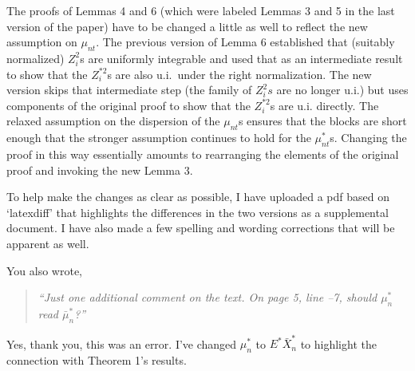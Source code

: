 \documentclass[12pt]{article}
\begin{document}
The proofs of Lemmas 4 and 6 (which were labeled Lemmas 3 and 5 in the
last version of the paper) have to be changed a little as well to
reflect the new assumption on $\mu_{nt}$. The previous version of
Lemma 6 established that (suitably normalized) $Z_i^2$s are uniformly
integrable and used that as an intermediate result to show that the
$Z_i^{*2}$s are also u.i.\ under the right normalization. The new
version skips that intermediate step (the family of $Z_i^2s$ are no
longer u.i.) but uses components of the original proof to show that
the $Z_i^{*2}$s are u.i. directly. The relaxed assumption on the
dispersion of the $\mu_{nt}$s ensures that the blocks are short
enough that the stronger assumption continues to hold for the
$\mu_{nt}^*$s.
Changing the proof in this way essentially amounts to rearranging the
elements of the original proof and invoking the new Lemma 3.

To help make the changes as clear as possible, I have uploaded a
pdf based on `latexdiff' that highlights the differences in the
two versions as a supplemental document. I have also made a few
spelling and wording corrections that will be apparent as well.

You also wrote,
\begin{quotation}
  \noindent%
  \textit{``Just one additional comment on the text. On page
    5, line --7, should $\mu_n^*$ read $\bar{\mu}_n^*$?''}
\end{quotation}
\noindent%
Yes, thank you, this was an error. I've changed $\mu_n^*$ to
$E^* \bar X_n^*$ to highlight the connection with Theorem 1's results.
\end{document}

